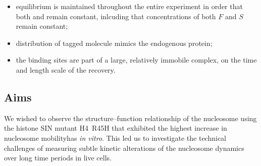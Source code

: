     \begin{itemize}
      \item equilibrium is maintained throughout the entire experiment in
            order that both \Kon{} and \Koff{} remain constant, 
			inlcuding that concentrations of both $F$ and $S$ remain constant;
      \item distribution of tagged molecule mimics the endogenous protein;
      \item the binding sites are part of a large, relatively immobile complex, 
	  		on the time and length scale of the recovery.
    \end{itemize}

  \subsection{Aims}

    We wished to observe the structure--function relationship of the nucleosome
	using the histone SIN mutant H4~R45H that exhibited the 
	highest increase in nucleosome mobilityhas \textit{in vitro}.
	This led us to investigate the technical challenges of measuring subtle kinetic
    alterations of the nucleosome dynamics over long time periods in live cells.

